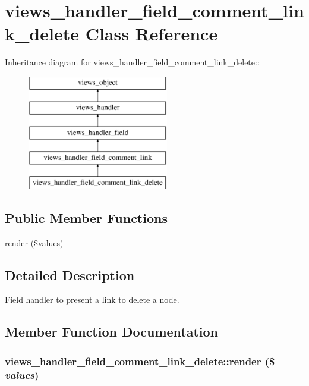 \hypertarget{classviews__handler__field__comment__link__delete}{
\section{views\_\-handler\_\-field\_\-comment\_\-link\_\-delete Class Reference}
\label{classviews__handler__field__comment__link__delete}
}
Inheritance diagram for views\_\-handler\_\-field\_\-comment\_\-link\_\-delete::\begin{figure}[H]
\begin{center}
\leavevmode
\includegraphics[height=5cm]{classviews__handler__field__comment__link__delete}
\end{center}
\end{figure}
\subsection*{Public Member Functions}
\begin{CompactItemize}
\item 
\hyperlink{classviews__handler__field__comment__link__delete_02265dfa1540e77c5d4c1792d36f4900}{render} (\$values)
\end{CompactItemize}


\subsection{Detailed Description}
Field handler to present a link to delete a node. 

\subsection{Member Function Documentation}
\hypertarget{classviews__handler__field__comment__link__delete_02265dfa1540e77c5d4c1792d36f4900}{
\subsubsection[{render}]{\setlength{\rightskip}{0pt plus 5cm}views\_\-handler\_\-field\_\-comment\_\-link\_\-delete::render (\$ {\em values})}}
\label{classviews__handler__field__comment__link__delete_02265dfa1540e77c5d4c1792d36f4900}


